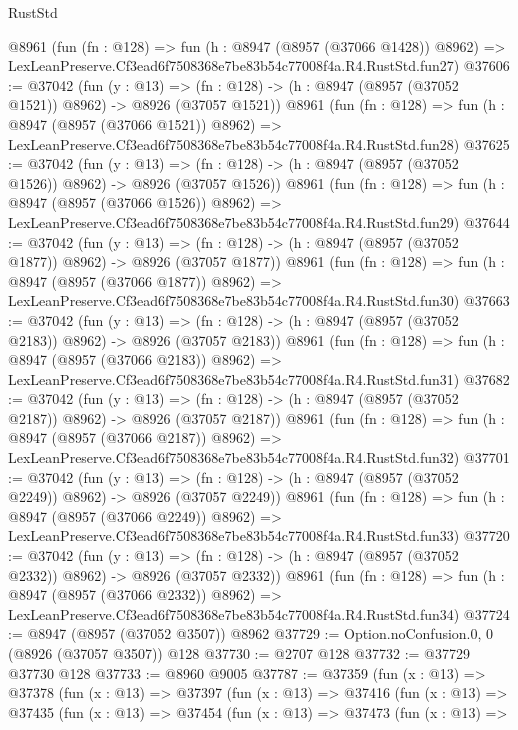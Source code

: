 \begin{lexlean}{RustStd}
\begin{coremodule}
    @8961
    (fun (fn : @128) =>
    fun (h : @8947 (@8957 (@37066 @1428)) @8962) =>
    LexLeanPreserve.Cf3ead6f7508368e7be83b54c77008f4a.R4.RustStd.fun27)
@37606 := @37042
    (fun (y : @13) =>
    (fn : @128) -> (h : @8947 (@8957 (@37052 @1521)) @8962) -> @8926 (@37057 @1521))
    @8961
    (fun (fn : @128) =>
    fun (h : @8947 (@8957 (@37066 @1521)) @8962) =>
    LexLeanPreserve.Cf3ead6f7508368e7be83b54c77008f4a.R4.RustStd.fun28)
@37625 := @37042
    (fun (y : @13) =>
    (fn : @128) -> (h : @8947 (@8957 (@37052 @1526)) @8962) -> @8926 (@37057 @1526))
    @8961
    (fun (fn : @128) =>
    fun (h : @8947 (@8957 (@37066 @1526)) @8962) =>
    LexLeanPreserve.Cf3ead6f7508368e7be83b54c77008f4a.R4.RustStd.fun29)
@37644 := @37042
    (fun (y : @13) =>
    (fn : @128) -> (h : @8947 (@8957 (@37052 @1877)) @8962) -> @8926 (@37057 @1877))
    @8961
    (fun (fn : @128) =>
    fun (h : @8947 (@8957 (@37066 @1877)) @8962) =>
    LexLeanPreserve.Cf3ead6f7508368e7be83b54c77008f4a.R4.RustStd.fun30)
@37663 := @37042
    (fun (y : @13) =>
    (fn : @128) -> (h : @8947 (@8957 (@37052 @2183)) @8962) -> @8926 (@37057 @2183))
    @8961
    (fun (fn : @128) =>
    fun (h : @8947 (@8957 (@37066 @2183)) @8962) =>
    LexLeanPreserve.Cf3ead6f7508368e7be83b54c77008f4a.R4.RustStd.fun31)
@37682 := @37042
    (fun (y : @13) =>
    (fn : @128) -> (h : @8947 (@8957 (@37052 @2187)) @8962) -> @8926 (@37057 @2187))
    @8961
    (fun (fn : @128) =>
    fun (h : @8947 (@8957 (@37066 @2187)) @8962) =>
    LexLeanPreserve.Cf3ead6f7508368e7be83b54c77008f4a.R4.RustStd.fun32)
@37701 := @37042
    (fun (y : @13) =>
    (fn : @128) -> (h : @8947 (@8957 (@37052 @2249)) @8962) -> @8926 (@37057 @2249))
    @8961
    (fun (fn : @128) =>
    fun (h : @8947 (@8957 (@37066 @2249)) @8962) =>
    LexLeanPreserve.Cf3ead6f7508368e7be83b54c77008f4a.R4.RustStd.fun33)
@37720 := @37042
    (fun (y : @13) =>
    (fn : @128) -> (h : @8947 (@8957 (@37052 @2332)) @8962) -> @8926 (@37057 @2332))
    @8961
    (fun (fn : @128) =>
    fun (h : @8947 (@8957 (@37066 @2332)) @8962) =>
    LexLeanPreserve.Cf3ead6f7508368e7be83b54c77008f4a.R4.RustStd.fun34)
@37724 := @8947 (@8957 (@37052 @3507)) @8962
@37729 := Option.noConfusion.{0, 0} (@8926 (@37057 @3507)) @128
@37730 := @2707 @128
@37732 := @37729 @37730 @128
@37733 := @8960 @9005
@37787 := @37359
    (fun (x : @13) =>
    @37378
      (fun (x : @13) =>
      @37397
        (fun (x : @13) =>
        @37416
          (fun (x : @13) =>
          @37435
            (fun (x : @13) =>
            @37454
              (fun (x : @13) =>
              @37473
                (fun (x : @13) =>

\end{coremodule}
\end{lexlean}
